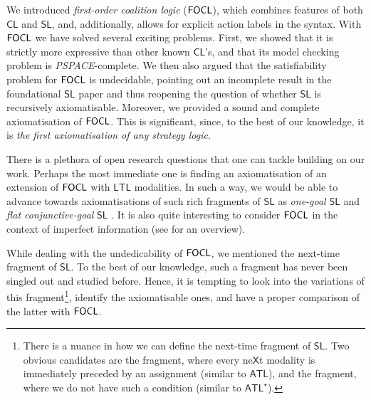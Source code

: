 \documentclass{article}
\begin{document}
We introduced \textit{first-order coalition logic} ($\mathsf{FOCL}$), which combines features of both $\mathsf{CL}$ and $\mathsf{SL}$, and, additionally, allows for explicit action labels in the syntax. With $\mathsf{FOCL}$ we have solved several exciting problems. First, we showed that it is strictly more expressive than other known $\mathsf{CL}$'s, and that its model checking problem is \textit{PSPACE}-complete. We then also argued that the satisfiability problem for $\mathsf{FOCL}$ is undecidable, pointing out an incomplete result in the foundational $\mathsf{SL}$ paper \cite{mogavero10} and thus reopening the question of whether $\mathsf{SL}$ is recursively axiomatisable.
Moreover, we provided a sound and complete axiomatisation of $\mathsf{FOCL}$. This is significant, since, to the best of our knowledge, it is \textit{the first axiomatisation of any strategy logic}. %



There is a plethora of open research questions that one can tackle building on our work. Perhaps the most immediate one is finding an axiomatisation of an extension of $\mathsf{FOCL}$ with $\mathsf{LTL}$ modalities. In such a way, we would be able to advance towards axiomatisations of such rich fragments of $\mathsf{SL}$ as \textit{one-goal} $\mathsf{SL}$ \cite{mogavero16} and \textit{flat conjunctive-goal} $\mathsf{SL}$ \cite{acar19}. It is also quite interesting to consider $\mathsf{FOCL}$ in the context of imperfect information (see \cite{agotnes15} for an overview). 

While dealing with the undedicability of $\mathsf{FOCL}$, we mentioned the next-time fragment of $\mathsf{SL}$. To the best of our knowledge, such a fragment has never been singled out and studied before. Hence, it is tempting to look into the variations of this fragment\footnote{There is a nuance in how we can define the next-time fragment of $\mathsf{SL}$. Two obvious candidates are the fragment, where every ne$\mathsf{X}$t modality is immediately preceded by an assignment (similar to $\mathsf{ATL}$), and the fragment, where we do not have such a condition (similar to $\mathsf{ATL}^\star$).}, identify the axiomatisable ones, and have a proper comparison of the latter with $\mathsf{FOCL}$. 
\end{document}
